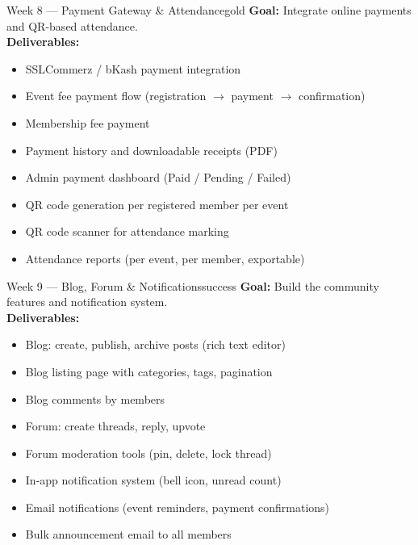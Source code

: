 \documentclass[12pt,a4paper]{article}
\begin{document}
\begin{weekbox}{Week 8 --- Payment Gateway \& Attendance}{gold}
\textbf{Goal:} Integrate online payments and QR-based attendance.\\[6pt]
\textbf{Deliverables:}
\begin{itemize}[leftmargin=*, itemsep=2pt]
  \item SSLCommerz / bKash payment integration
  \item Event fee payment flow (registration $\rightarrow$ payment $\rightarrow$ confirmation)
  \item Membership fee payment
  \item Payment history and downloadable receipts (PDF)
  \item Admin payment dashboard (Paid / Pending / Failed)
  \item QR code generation per registered member per event
  \item QR code scanner for attendance marking
  \item Attendance reports (per event, per member, exportable)
\end{itemize}
\end{weekbox}

\vspace{8pt}

\begin{weekbox}{Week 9 --- Blog, Forum \& Notifications}{success}
\textbf{Goal:} Build the community features and notification system.\\[6pt]
\textbf{Deliverables:}
\begin{itemize}[leftmargin=*, itemsep=2pt]
  \item Blog: create, publish, archive posts (rich text editor)
  \item Blog listing page with categories, tags, pagination
  \item Blog comments by members
  \item Forum: create threads, reply, upvote
  \item Forum moderation tools (pin, delete, lock thread)
  \item In-app notification system (bell icon, unread count)
  \item Email notifications (event reminders, payment confirmations)
  \item Bulk announcement email to all members
\end{itemize}
\end{weekbox}

\vspace{8pt}
\end{document}
